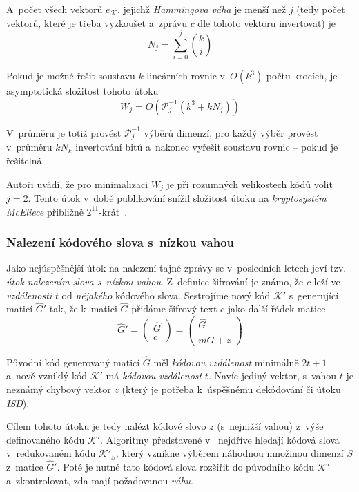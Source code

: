 \documentclass[thesis=M,czech,hidelinks]{FITthesis}[2012/06/26]
\newcommand{\0}{{\textcolor[gray]{0.75}{0}}}
\begin{document}
A~počet všech vektorů $e_\mathcal{K}$, jejichž \emph{Hammingova váha} je menší
než $j$ (tedy počet vektorů, které je třeba vyzkoušet a~zprávu $c$ dle tohoto
vektoru invertovat) je
$$ N_j = \sum_{i=0}^{j}\binom{k}{i} $$

Pokud je možné řešit soustavu $k$ lineárních rovnic v~$O(k^3)$ počtu krocích, je
asymptotická složitost tohoto útoku
$$ W_j = O\left( \mathcal{P}_{j}^{-1}\left(k^3 + k N_j \right) \right) $$

V~průměru je totiž provést $\mathcal{P}_{j}^{-1}$ výběrů dimenzí, pro každý
výběr provést v~průměru $k N_k$ invertování bitů a~nakonec vyřešit soustavu
rovnic -- pokud je řešitelná.

Autoři uvádí, že pro minimalizaci $W_j$ je při rozumných velikostech kódů volit
$j=2$. Tento útok v~době publikování snížil složitost útoku na
\emph{kryptosystém McEliece} přibližně $2^11$-krát~\cite{Lee}.


\subsubsection{Nalezení kódového slova s~nízkou vahou}

Jako nejúspěšnější útok na nalezení tajné zprávy se v~posledních letech jeví
tzv. \emph{útok nalezením slova s~nízkou vahou}. Z~definice šifrování je známo,
že $c$ leží ve \emph{vzdálenosti} $t$ od \emph{nějakého} kódového slova.
Sestrojíme nový kód $\mathcal{K}'$ s~generující maticí $\hat{G}'$ tak, že
k~matici $\hat{G}$ přidáme šifrový text $c$ jako další řádek matice
$$
    \hat{G}' = \left(\begin{array}{c}
        \hat{G} \\
        c
    \end{array}\right) = \left(\begin{array}{c}
        \hat{G} \\
        m\hat{G} + z
    \end{array}\right)
$$

Původní kód generovaný maticí $\hat{G}$ měl \emph{kódovou vzdálenost} minimálně
$2t+1$ a~nově vzniklý kód $\mathcal{K}'$ má \emph{kódovou vzdálenost} $t$. Navíc
jediný vektor, s~vahou $t$ je neznámý chybový vektor $z$ (který je potřeba
k~úspěšnému dekódování či útoku \emph{ISD}).

Cílem tohoto útoku je tedy nalézt kódové slovo $z$ (s~nejnižší vahou) z~výše
definovaného kódu $\mathcal{K}'$. Algoritmy představené
v~\cite{Leon,Stern,Canteaut} nejdříve hledají kódová slova v~redukovaném kódu
$\mathcal{K}'_S$, který vznikne výběrem náhodnou množinou dimenzí $S$ z~matice
$\hat{G}'$. Poté je nutné tato kódová slova rozšířit do původního kódu
$\mathcal{K}'$ a~zkontrolovat, zda mají požadovanou \emph{váhu}.
\end{document}
